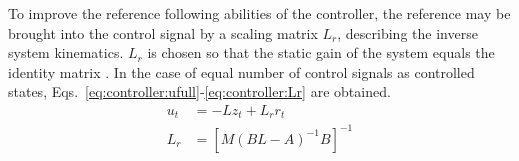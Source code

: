     To improve the reference following abilities of the controller,
    the reference may be brought into the control signal by a scaling
    matrix $L_{r}$, describing the inverse system kinematics.
    $L_{r}$ is chosen so that the static gain of the
    system equals the identity matrix \citep{glad2003reglerteori}.
    In the case of equal number of control signals as controlled
    states, Eqs.~\eqref{eq:controller:ufull}-\eqref{eq:controller:Lr} are obtained.
    \begin{align}
        u_{t} &= -Lz_{t} + L_{r}r_{t} \label{eq:controller:ufull} \\
%
        L_{r} &= \left[M(BL - A)^{-1}B\right]^{-1} \label{eq:controller:Lr}
    \end{align}


